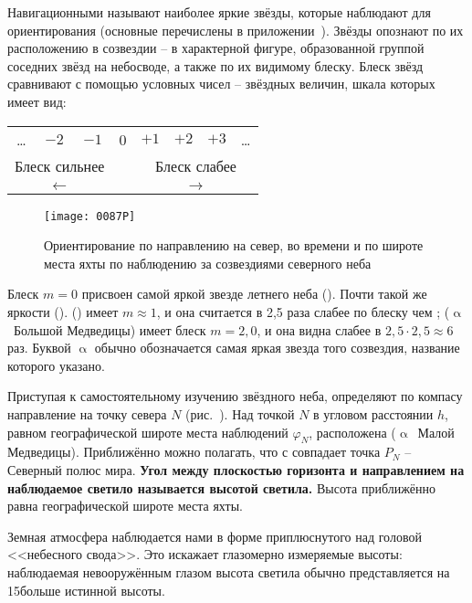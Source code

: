Навигационными называют наиболее яркие звёзды, которые наблюдают для
ориентирования (основные перечислены в
приложении~). Звёзды опознают по их
расположению в созвездии \--- в характерной фигуре, образованной
группой соседних звёзд на небосводе, а также по их видимому блеску.
Блеск звёзд сравнивают с помощью условных чисел \--- звёздных величин,
шкала которых имеет вид:

\begin{center}
  \small
  \begin{tabular}[c]{cccccccc}
    \ldots & $-2$ & $-1$ & 0 & $+1$ & $+2$ & $+3$ & \ldots \\
    \multicolumn{3}{c}{Блеск сильнее} & & \multicolumn{4}{c}{Блеск слабее} \\
    \multicolumn{3}{c}{$\longleftarrow$} & & \multicolumn{4}{c}{$\longrightarrow$} 
  \end{tabular}
\end{center}

\begin{figure*}[!htb]
  \centering{}
  \texttt{[image: 0087P]}
  \caption{Ориентирование по направлению на север, во времени и по
    широте места яхты по наблюдению за созвездиями северного неба}
  \label{fig:87}
\end{figure*}

Блеск $m=0$ присвоен самой яркой звезде летнего неба 
(). Почти такой же яркости 
().  () имеет
$m \approx 1$, и она считается в 2,5 раза слабее по блеску чем
;  ($\upalpha$~Большой Медведицы) имеет
блеск $m = 2,0$, и она видна слабее  в
$2,5 \cdot 2,5 \approx 6$ раз. Буквой $\upalpha$ обычно обозначается
самая яркая звезда того созвездия, название которого указано.

Приступая к самостоятельному изучению звёздного неба, определяют по
компасу направление на точку севера $N$ (рис.~). Над точкой
$N$ в угловом расстоянии $h$, равном географической широте места
наблюдений $\varphi_N$, расположена 
($\upalpha$~Малой Медведицы). Приближённо можно полагать, что с
 совпадает точка $P_N$ \--- Северный полюс
мира. \textbf{Угол между плоскостью горизонта и направлением на
  наблюдаемое светило называется высотой светила.}%
Высота  приближённо равна географической
широте места яхты.

Земная атмосфера наблюдается нами в форме приплюснутого над головой
<<небесного свода>>. Это искажает глазомерно измеряемые высоты:
наблюдаемая невооружённым глазом высота светила обычно представляется
на 15\gr больше истинной высоты.

